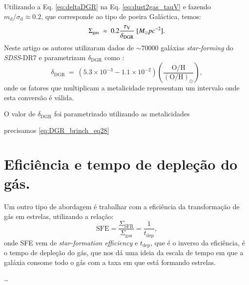 Utilizando a Eq. \ref{eq:deltaDGR} na Eq. \ref{eq:dust2gas_tauV} e fazendo
$m_{\mathrm{d}}/\sigma_{\mathrm{d}} \approx 0.2$, que corresponde ao tipo de poeira Galáctica, temos:
\begin{equation}
	\Sigma_{\mathrm{gas}}\ \approx\ 0.2 \frac{\tau_{\mathrm{V}}}{\delta_{\mathrm{DGR}}}\ [M_\odot pc^{-2}].
	\label{eq:dust2gas_brinch}
\end{equation}
Neste artigo os autores utilizaram dados de $\sim 70000$ galáxias {\em star-forming} do
\textit{SDSS}-DR7 e parametrizam $\delta_{\mathrm{DGR}}$ como \citep[][Eq.
28]{Brinchmann.etal.2013a}:
\begin{equation}
	\delta_{\mathrm{DGR}}\ =\ (5.3 \times 10^{-3} - 1.1 \times 10^{-2})
\left(\frac{\mathrm{O/H}}{(\mathrm{O/H})_\odot}\right),
	\label{eq:DGR_brinch_eq28}
\end{equation}
\noindent onde os fatores que multiplicam a metalicidade representam um intervalo onde esta
conversão é válida.

O valor de $\delta_{\mathrm{DGR}}$ foi parametrizado utilizando as metalicidades 

precisamos 
\ref{eq:DGR_brinch_eq28}

\section{Eficiência e tempo de depleção do gás.}
\label{sec:gasfrac:SFE}

Um outro tipo de abordagem é trabalhar com a eficiência da transformação de gás em estrelas,
utilizando a relação:
\begin{equation}
	\mathrm{SFE} = \frac{\Sigma_{\mathrm{SFR}}}{\Sigma_{\mathrm{gas}}} = \frac{1}{t_{\mathrm{dep}}},
	\label{eq:SFE}
\end{equation}
\noindent onde SFE vem de {\em star-formation efficiency} e $t_{\mathrm{dep}}$, que é o inverso da
eficiência, é o tempo de depleção do gás, que nos dá uma ideia da escala de tempo em que a galáxia
consome todo o gás com a taxa em que está formando estrelas.

\ldots

